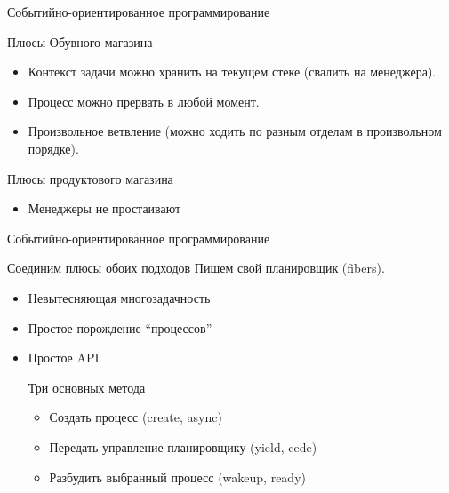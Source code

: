 \documentclass[aspectratio=169]{beamer}
\begin{document}
\begin{frame}{Событийно-ориентированное программирование}
    \begin{block}{Плюсы Обувного магазина}
        \begin{itemize}
            \item Контекст задачи можно хранить на текущем стеке
                (свалить на менеджера).
            \item Процесс можно прервать в любой момент.
            \item Произвольное ветвление (можно ходить по разным
                отделам в произвольном порядке).
        \end{itemize}
    \end{block}

    \begin{block}{Плюсы продуктового магазина}
        \begin{itemize}
            \item Менеджеры не простаивают
        \end{itemize}
    \end{block}
\end{frame}

\begin{frame}{Событийно-ориентированное программирование}
    \begin{block}{Соединим плюсы обоих подходов}
        Пишем свой планировщик (fibers).
        \begin{itemize}
            \item Невытесняющая многозадачность
            \item Простое порождение ``процессов''
            \item Простое API
                \par Три основных метода
                \begin{itemize}
                    \item Создать процесс (create, async)
                    \item Передать управление планировщику (yield, cede)
                    \item Разбудить выбранный процесс (wakeup, ready)
                \end{itemize}
        \end{itemize}
    \end{block}
\end{frame}
\end{document}

